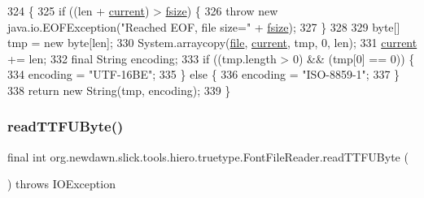 \begin{DoxyCode}
324                                                                   \{
325         \textcolor{keywordflow}{if} ((len + \mbox{\hyperlink{classorg_1_1newdawn_1_1slick_1_1tools_1_1hiero_1_1truetype_1_1_font_file_reader_ab082d04b7f0a287496055b8e5f203cb4}{current}}) > \mbox{\hyperlink{classorg_1_1newdawn_1_1slick_1_1tools_1_1hiero_1_1truetype_1_1_font_file_reader_a247fb2663cf669a7842919c405f41bfe}{fsize}}) \{
326             \textcolor{keywordflow}{throw} \textcolor{keyword}{new} java.io.EOFException(\textcolor{stringliteral}{"Reached EOF, file size="} + \mbox{\hyperlink{classorg_1_1newdawn_1_1slick_1_1tools_1_1hiero_1_1truetype_1_1_font_file_reader_a247fb2663cf669a7842919c405f41bfe}{fsize}});
327         \}
328 
329         byte[] tmp = \textcolor{keyword}{new} byte[len];
330         System.arraycopy(\mbox{\hyperlink{classorg_1_1newdawn_1_1slick_1_1tools_1_1hiero_1_1truetype_1_1_font_file_reader_ab4c57b8a3e3eba60293c11bf50d7cc42}{file}}, \mbox{\hyperlink{classorg_1_1newdawn_1_1slick_1_1tools_1_1hiero_1_1truetype_1_1_font_file_reader_ab082d04b7f0a287496055b8e5f203cb4}{current}}, tmp, 0, len);
331         \mbox{\hyperlink{classorg_1_1newdawn_1_1slick_1_1tools_1_1hiero_1_1truetype_1_1_font_file_reader_ab082d04b7f0a287496055b8e5f203cb4}{current}} += len;
332         \textcolor{keyword}{final} String encoding;
333         \textcolor{keywordflow}{if} ((tmp.length > 0) && (tmp[0] == 0)) \{
334             encoding = \textcolor{stringliteral}{"UTF-16BE"};
335         \} \textcolor{keywordflow}{else} \{
336             encoding = \textcolor{stringliteral}{"ISO-8859-1"};
337         \}
338         \textcolor{keywordflow}{return} \textcolor{keyword}{new} String(tmp, encoding);
339     \}
\end{DoxyCode}
\mbox{\label{classorg_1_1newdawn_1_1slick_1_1tools_1_1hiero_1_1truetype_1_1_font_file_reader_af208587b367fbf19afbfd0cb584b7563}} 
\subsubsection{\texorpdfstring{read\+T\+T\+F\+U\+Byte()}{readTTFUByte()}}
{\footnotesize\ttfamily final int org.\+newdawn.\+slick.\+tools.\+hiero.\+truetype.\+Font\+File\+Reader.\+read\+T\+T\+F\+U\+Byte (\begin{DoxyParamCaption}{ }\end{DoxyParamCaption}) throws I\+O\+Exception\hspace{0.3cm}{\ttfamily [inline]}}

